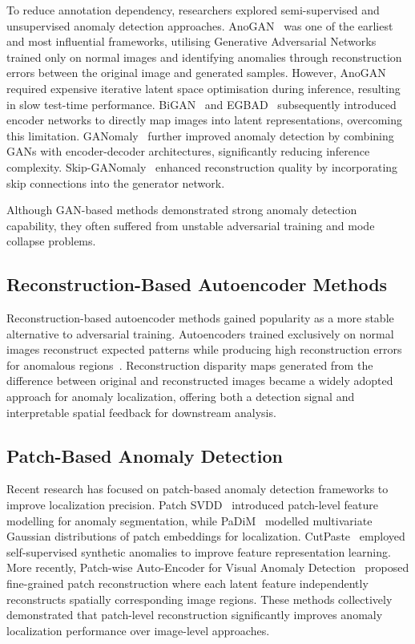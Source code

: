 \documentclass{bmvc2k}
\begin{document}
To reduce annotation dependency, researchers explored semi-supervised and unsupervised 
anomaly detection approaches. AnoGAN~\cite{schlegl2017anogan} was one of the earliest 
and most influential frameworks, utilising Generative Adversarial Networks trained only 
on normal images and identifying anomalies through reconstruction errors between the 
original image and generated samples. However, AnoGAN required expensive iterative 
latent space optimisation during inference, resulting in slow test-time performance. 
BiGAN~\cite{donahue2016bigan} and EGBAD~\cite{zenati2018egbad} subsequently introduced 
encoder networks to directly map images into latent representations, overcoming this 
limitation. GANomaly~\cite{akcay2018ganomaly} further improved anomaly detection by 
combining GANs with encoder-decoder architectures, significantly reducing inference 
complexity. Skip-GANomaly~\cite{akcay2019skip} enhanced reconstruction quality by 
incorporating skip connections into the generator network.

Although GAN-based methods demonstrated strong anomaly detection capability, they often 
suffered from unstable adversarial training and mode collapse problems.

\subsection{Reconstruction-Based Autoencoder Methods}

Reconstruction-based autoencoder methods gained popularity as a more stable alternative 
to adversarial training. Autoencoders trained exclusively on normal images reconstruct 
expected patterns while producing high reconstruction errors for anomalous 
regions~\cite{bergmann2019mvtec}. Reconstruction disparity maps generated from the 
difference between original and reconstructed images became a widely adopted approach 
for anomaly localization, offering both a detection signal and interpretable spatial 
feedback for downstream analysis.

\subsection{Patch-Based Anomaly Detection}

Recent research has focused on patch-based anomaly detection frameworks to improve 
localization precision. Patch SVDD~\cite{yi2020patchsvdd} introduced patch-level 
feature modelling for anomaly segmentation, while PaDiM~\cite{defard2020padim} modelled 
multivariate Gaussian distributions of patch embeddings for localization. 
CutPaste~\cite{li2021cutpaste} employed self-supervised synthetic anomalies to improve 
feature representation learning. More recently, Patch-wise Auto-Encoder for Visual 
Anomaly Detection~\cite{patchae2023} proposed fine-grained patch reconstruction where 
each latent feature independently reconstructs spatially corresponding image regions. 
These methods collectively demonstrated that patch-level reconstruction significantly 
improves anomaly localization performance over image-level approaches.
\end{document}
